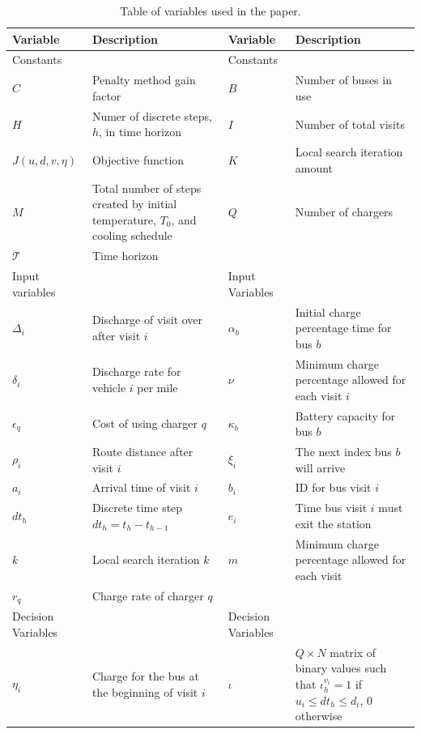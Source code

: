 \documentclass[11pt,a4paper,final]{article}
\newcommand{\T}{\mathcal{T}}                %
\newcommand{\Tau}{T}                        %
\begin{document}
\begin{table}[htbp]
\caption{\label{tab:variables}Table of variables used in the paper.}
\centering
\begin{tabularx}{\textwidth}{L{0.3} L{1.2} L{0.3} L{1.2}}
\textbf{Variable} & \textbf{Description} & \textbf{Variable} & \textbf{Description}\\[0pt]
\hline
Constants &  & Constants & \\[0pt]
\(C\) & Penalty method gain factor & \(B\) & Number of buses in use\\[0pt]
\(H\) & Numer of discrete steps, \(h\), in time horizon & \(I\) & Number of total visits\\[0pt]
\(J(u,d,v,\eta)\) & Objective function & \(K\) & Local search iteration amount\\[0pt]
\(M\) & Total number of steps created by initial temperature, \(\Tau_0\), and cooling schedule & \(Q\) & Number of chargers\\[0pt]
\(\T\) & Time horizon &  & \\[0pt]
\hline
Input variables &  & Input Variables & \\[0pt]
\(\Delta_i\) & Discharge of visit over after visit \(i\) & \(\alpha_b\) & Initial charge percentage time for bus \(b\)\\[0pt]
\(\delta_i\) & Discharge rate for vehicle \(i\) per mile & \(\nu\) & Minimum charge percentage allowed for each visit \(i\)\\[0pt]
\(\epsilon_q\) & Cost of using charger \(q\) & \(\kappa_b\) & Battery capacity for bus \(b\)\\[0pt]
\(\rho_i\) & Route distance after visit \(i\) & \(\xi_i\) & The next index bus \(b\) will arrive\\[0pt]
\(a_i\) & Arrival time of visit \(i\) & \(b_i\) & ID for bus visit \(i\)\\[0pt]
\(dt_h\) & Discrete time step \(dt_h = t_h - t_{h-1}\) & \(e_i\) & Time bus visit \(i\) must exit the station\\[0pt]
\(k\) & Local search iteration \(k\) & \(m\) & Minimum charge percentage allowed for each visit\\[0pt]
\(r_q\) & Charge rate of charger \(q\) &  & \\[0pt]
\hline
Decision Variables &  & Decision Variables & \\[0pt]
\(\eta_i\) & Charge for the bus at the beginning of visit \(i\) & \(\iota\) & \(Q \times N\) matrix of binary values such that \(\iota_h^{v_i} = 1\) if \(u_i \le dt_h \le d_i\), 0 otherwise\\[0pt]

\end{tabularx}
\end{table}
\end{document}
